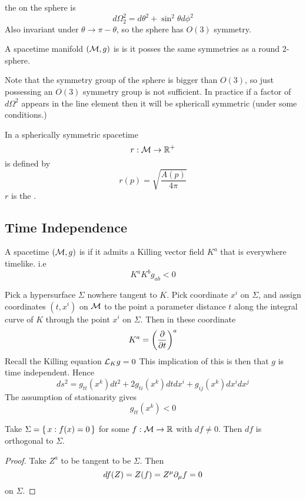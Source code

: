 \documentclass{article}
\begin{document}
\begin{definition}
the  on the sphere is 
\[
d\Omega_2^2 = d\theta^2 + \sin^2\theta d\phi^2
\]
Also invariant under $\theta \to \pi-\theta$, so the sphere has $O(3)$ symmetry. 
\end{definition}

\begin{definition}
A spacetime manifold $(\mathcal{M},g)$ is  is it posses the same symmetries as a round 2-sphere. 
\end{definition}

\begin{idea}
Note that the symmetry group of the sphere is bigger than $O(3)$, so just possessing an $O(3)$ symmetry group is not sufficient. In practice if a factor of $d\Omega^2$ appears in the line element then it will be sphericall symmetric (under some conditions.)
\end{idea}

\begin{definition}[Radius]
In a spherically symmetric spacetime
\[
r : \mathcal{M} \to \mathbb{R}^+
\]
is defined by 
\[
r(p) = \sqrt{\frac{A(p)}{4\pi}}
\]
$r$ is the . 
\end{definition}

\subsection{Time Independence}

\begin{definition}[Stationary]
 A spacetime $(\mathcal{M},g)$ is  if it admits a Killing vector field $K^a$ that is everywhere timelike. i.e 
 \[
  K^a K^b g_{ab} < 0 
 \]
\end{definition}
Pick a hypersurface $\Sigma$ nowhere tangent to $K$. Pick coordinate $x^i$ on $\Sigma$, and assign coordinates $(t,x^i)$ on $\mathcal{M}$ to the point a parameter distance $t$ along the integral curve of $K$ through the point $x^i$ on $\Sigma$. Then in these coordinate 
\[
K^a = \left( \frac{\partial}{\partial t} \right)^a
\]
Recall the Killing equation $\mathcal{L}_K g = 0$ This implication of this is then that $g$ is time independent. Hence
\[
ds^2 = g_{tt}(x^k) dt^2 + 2g_{ti}(x^k) dt dx^i + g_{ij}(x^k) dx^i dx^j 
\]
The assumption of stationarity gives 
\[
g_{tt}(x^k) < 0
\]

\begin{lemma}
Take $\Sigma=\set{x: f(x)=0}$ for some $f:\mathcal{M} \to \mathbb{R}$ with $df \neq 0$. Then $df$ is orthogonal to $\Sigma$.  
\end{lemma}
\begin{proof}
Take $Z^a$ to be tangent to be $\Sigma$. Then 
\[
df(Z) = Z(f) = Z^\mu \partial_\mu f = 0
\]
on $\Sigma$.
\end{proof}
\end{document}
